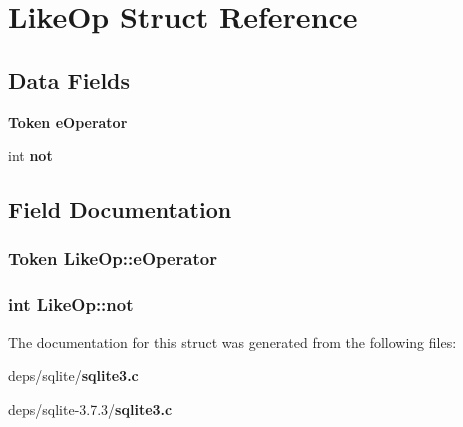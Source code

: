 \section{Like\-Op Struct Reference}
\label{structLikeOp}
\subsection*{Data Fields}
\begin{CompactItemize}
\item 
\bf{Token} \bf{e\-Operator}
\item 
int \bf{not}
\end{CompactItemize}


\subsection{Field Documentation}
\subsubsection{\setlength{\rightskip}{0pt plus 5cm}\bf{Token} \bf{Like\-Op::e\-Operator}}\label{structLikeOp_f571bdc1eb91919900869662af6f666a}


\subsubsection{\setlength{\rightskip}{0pt plus 5cm}int \bf{Like\-Op::not}}\label{structLikeOp_09bf2a433f63ef8fa86ab73f7b6eefd7}




The documentation for this struct was generated from the following files:\begin{CompactItemize}
\item 
deps/sqlite/\bf{sqlite3.c}\item 
deps/sqlite-3.7.3/\bf{sqlite3.c}\end{CompactItemize}
